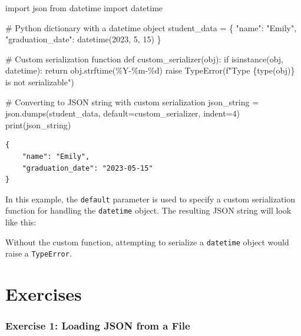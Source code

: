 \documentclass[
  letterpaper,
  DIV=11,
  numbers=noendperiod]{scrreprt}
\newenvironment{Shaded}{\begin{snugshade}}{\end{snugshade}}
\newcommand{\BuiltInTok}[1]{\textcolor[rgb]{0.00,0.23,0.31}{#1}}
\newcommand{\CommentTok}[1]{\textcolor[rgb]{0.37,0.37,0.37}{#1}}
\newcommand{\ControlFlowTok}[1]{\textcolor[rgb]{0.00,0.23,0.31}{#1}}
\newcommand{\DecValTok}[1]{\textcolor[rgb]{0.68,0.00,0.00}{#1}}
\newcommand{\ImportTok}[1]{\textcolor[rgb]{0.00,0.46,0.62}{#1}}
\newcommand{\KeywordTok}[1]{\textcolor[rgb]{0.00,0.23,0.31}{#1}}
\newcommand{\NormalTok}[1]{\textcolor[rgb]{0.00,0.23,0.31}{#1}}
\newcommand{\OperatorTok}[1]{\textcolor[rgb]{0.37,0.37,0.37}{#1}}
\newcommand{\PreprocessorTok}[1]{\textcolor[rgb]{0.68,0.00,0.00}{#1}}
\newcommand{\SpecialCharTok}[1]{\textcolor[rgb]{0.37,0.37,0.37}{#1}}
\newcommand{\SpecialStringTok}[1]{\textcolor[rgb]{0.13,0.47,0.30}{#1}}
\newcommand{\StringTok}[1]{\textcolor[rgb]{0.13,0.47,0.30}{#1}}
\begin{document}
\begin{Shaded}
\begin{Highlighting}[]
\ImportTok{import}\NormalTok{ json}
\ImportTok{from}\NormalTok{ datetime }\ImportTok{import}\NormalTok{ datetime}

\CommentTok{\# Python dictionary with a datetime object}
\NormalTok{student\_data }\OperatorTok{=}\NormalTok{ \{}
    \StringTok{"name"}\NormalTok{: }\StringTok{"Emily"}\NormalTok{,}
    \StringTok{"graduation\_date"}\NormalTok{: datetime(}\DecValTok{2023}\NormalTok{, }\DecValTok{5}\NormalTok{, }\DecValTok{15}\NormalTok{)}
\NormalTok{\}}

\CommentTok{\# Custom serialization function}
\KeywordTok{def}\NormalTok{ custom\_serializer(obj):}
    \ControlFlowTok{if} \BuiltInTok{isinstance}\NormalTok{(obj, datetime):}
        \ControlFlowTok{return}\NormalTok{ obj.strftime(}\StringTok{\textquotesingle{}\%Y{-}\%m{-}}\SpecialCharTok{\%d}\StringTok{\textquotesingle{}}\NormalTok{)}
    \ControlFlowTok{raise} \PreprocessorTok{TypeError}\NormalTok{(}\SpecialStringTok{f"Type }\SpecialCharTok{\{}\BuiltInTok{type}\NormalTok{(obj)}\SpecialCharTok{\}}\SpecialStringTok{ is not serializable"}\NormalTok{)}

\CommentTok{\# Converting to JSON string with custom serialization}
\NormalTok{json\_string }\OperatorTok{=}\NormalTok{ json.dumps(student\_data, default}\OperatorTok{=}\NormalTok{custom\_serializer, indent}\OperatorTok{=}\DecValTok{4}\NormalTok{)}
\BuiltInTok{print}\NormalTok{(json\_string)}
\end{Highlighting}
\end{Shaded}

\begin{verbatim}
{
    "name": "Emily",
    "graduation_date": "2023-05-15"
}
\end{verbatim}

In this example, the \texttt{default} parameter is used to specify a
custom serialization function for handling the \texttt{datetime} object.
The resulting JSON string will look like this:

Without the custom function, attempting to serialize a \texttt{datetime}
object would raise a \texttt{TypeError}.

\hypertarget{exercises-8}{%
\section{Exercises}\label{exercises-8}}

\hypertarget{exercise-1-loading-json-from-a-file}{%
\subsubsection{Exercise 1: Loading JSON from a
File}\label{exercise-1-loading-json-from-a-file}}
\end{document}
